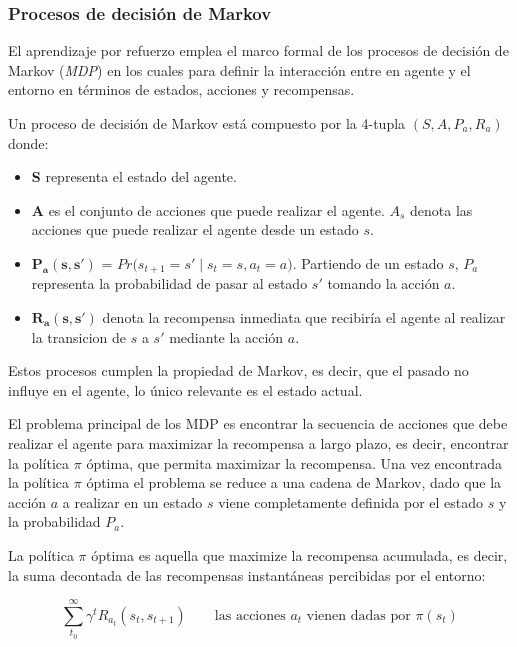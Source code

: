 \subsubsection{Procesos de decisión de Markov}

El aprendizaje por refuerzo emplea el marco formal de los procesos de decisión de Markov (\textit{MDP}) en los cuales para definir la interacción entre en agente y el entorno en términos de estados, acciones y recompensas.

Un proceso de decisión de Markov está compuesto por la 4-tupla $(S,A,P_a,R_a)$ donde:

\begin{itemize}
	\item \textbf{S} representa el estado del agente.
	\item \textbf{A} es el conjunto de acciones que puede realizar el agente. $A_s$ denota las acciones que puede realizar el agente desde un estado $s$.
	\item \textbf{$\boldsymbol{P_a(s,s')}$} = $Pr\big(s_{t+1} = s' \;|\; s_t = s , a_t = a  \big)$. Partiendo de un estado $s$, $P_a$ representa la probabilidad de pasar al estado $s'$ tomando la acción $a$.
	\item \textbf{$\boldsymbol{R_a(s,s')}$} denota la recompensa inmediata que recibiría el agente al realizar la transicion de $s$ a $s'$ mediante la acción $a$.
\end{itemize}

Estos procesos cumplen la propiedad de Markov, es decir, que el pasado no influye en el agente, lo único relevante es el estado actual.

El problema principal de los MDP es encontrar la secuencia de acciones que debe realizar el agente para maximizar la recompensa a largo plazo, es decir, encontrar la política $\pi$ 
óptima, que permita maximizar la recompensa. Una vez encontrada la política $\pi$ óptima el problema se reduce a una cadena de Markov, dado que la acción $a$ a realizar en un estado $s$ viene completamente definida por el estado $s$ y la probabilidad $P_a$. 

La política $\pi$ óptima es aquella que maximize la recompensa acumulada, es decir, la suma decontada de las recompensas instantáneas percibidas por el entorno:

\begin{equation}
	\sum_{t_0}^{\infty}\gamma^t R_{a_t}(s_t,s_{t+1}) \qquad \text{las acciones $a_t$ vienen dadas por $\pi(s_t)$}
\end{equation}

